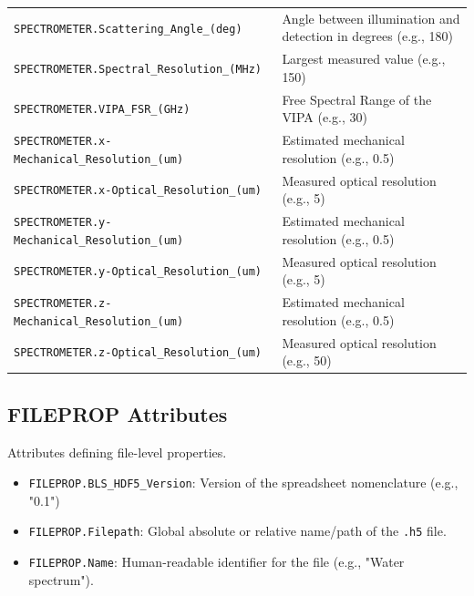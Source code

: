 \documentclass{article}
\begin{document}
\begin{longtable}{p{8cm} p{7.5cm}}
\texttt{SPECTROMETER.Scattering\_Angle\_(deg)} & Angle between illumination and detection in degrees (e.g., 180) \\
\texttt{SPECTROMETER.Spectral\_Resolution\_(MHz)} & Largest measured value (e.g., 150) \\
\texttt{SPECTROMETER.VIPA\_FSR\_(GHz)} & Free Spectral Range of the VIPA (e.g., 30) \\
\texttt{SPECTROMETER.x-Mechanical\_Resolution\_(um)} & Estimated mechanical resolution (e.g., 0.5) \\
\texttt{SPECTROMETER.x-Optical\_Resolution\_(um)} & Measured optical resolution (e.g., 5) \\
\texttt{SPECTROMETER.y-Mechanical\_Resolution\_(um)} & Estimated mechanical resolution (e.g., 0.5) \\
\texttt{SPECTROMETER.y-Optical\_Resolution\_(um)} & Measured optical resolution (e.g., 5) \\
\texttt{SPECTROMETER.z-Mechanical\_Resolution\_(um)} & Estimated mechanical resolution (e.g., 0.5) \\
\texttt{SPECTROMETER.z-Optical\_Resolution\_(um)} & Measured optical resolution (e.g., 50) \\
\bottomrule
\end{longtable}

\subsection{FILEPROP Attributes}
Attributes defining file-level properties.
\begin{itemize}
    \item \texttt{FILEPROP.BLS\_HDF5\_Version}: Version of the spreadsheet nomenclature (e.g., "0.1")
    \item \texttt{FILEPROP.Filepath}: Global absolute or relative name/path of the \texttt{.h5} file.
    \item \texttt{FILEPROP.Name}: Human-readable identifier for the file (e.g., "Water spectrum").
\end{itemize}
\end{document}
